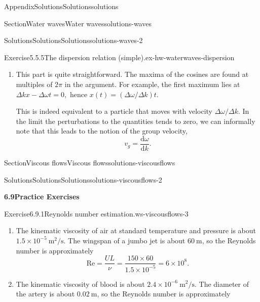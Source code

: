 \documentclass[oneside,10pt,]{book}
\numberwithin{equation}{section}
\newcommand{\de}{\mathrm{d}}
\newcommand{\dd}[2]{\frac{\de#1}{\de#2}}
\begin{document}
\begin{appendixptx}{Appendix}{Solutions}{}{Solutions}{}{}{solutions}
\begin{sectionptx}{Section}{Water waves}{}{Water waves}{}{}{solutions-waves}
\begin{solutions-subsection-numberless}{Solutions}{Solutions}{}{Solutions}{}{}{solutions-waves-2}
\begin{divisionsolution}{Exercise}{5.5.5}{The dispersion relation (simple).}{ex-hw-waterwaves-dispersion}
\begin{enumerate}[font=\bfseries,label=(\alph*),ref=\alph*]
\item[(c)]\noindent\hypertarget{ex-hw-waterwaves-dispersion-5-2-main}{}This part is quite straightforward. The maxima of the cosines are found at multiples of \(2\pi\) in the argument. For example, the first maximum lies at \(\Delta k x - \Delta \omega t = 0,\) hence \(x(t) = (\Delta \omega/\Delta k)t.\)%
\par
This is indeed equivalent to a particle that moves with velocity \(\Delta \omega/\Delta k\). In the limit the perturbations to the quantities tends to zero, we can informally note that this leads to the notion of the group velocity,%
\begin{equation*}
v_g = \dd{\omega}{k}.
\end{equation*}
%
\end{enumerate}%
\end{divisionsolution}%
\end{solutions-subsection-numberless}
\end{sectionptx}
%
%
\typeout{************************************************}
\typeout{************************************************}
%
\begin{sectionptx}{Section}{Viscous flows}{}{Viscous flows}{}{}{solutions-viscousflows}
%
%
\typeout{************************************************}
\typeout{************************************************}
%
\begin{solutions-subsection-numberless}{Solutions}{Solutions}{}{Solutions}{}{}{solutions-viscousflows-2}
\par\medskip
\noindent\textbf{\normalsize{}6.9\space\textperiodcentered\space{}Practice Exercises}
\begin{divisionsolution}{Exercise}{6.9.1}{Reynolds number estimation.}{ws-viscousflows-3}%
\begin{enumerate}[font=\bfseries,label=(\alph*),ref=\alph*]%
\item[(a)]\noindent\hypertarget{ws-viscousflows-3-3-2-main}{}The kinematic viscosity of air at standard temperature and pressure is about \(1.5\times10^{-5}~\textrm{m}^2/\textrm{s}\). The wingspan of a jumbo jet is about \(60~\textrm{m}\), so the Reynolds number is approximately%
\begin{equation*}
\textrm{Re}=\frac{UL}{\nu}
=\frac{150\times60}{1.5\times10^{-5}}
=6\times10^8.
\end{equation*}
%
\item[(b)]\noindent\hypertarget{ws-viscousflows-3-4-2-main}{}The kinematic viscosity of blood is about \(2.4\times10^{-6}~\textrm{m}^2/\textrm{s}\). The diameter of the artery is about \(0.02~\textrm{m}\), so the Reynolds number is approximately%

\end{enumerate}
\end{divisionsolution}
\end{solutions-subsection-numberless}
\end{sectionptx}
\end{appendixptx}
\end{document}
